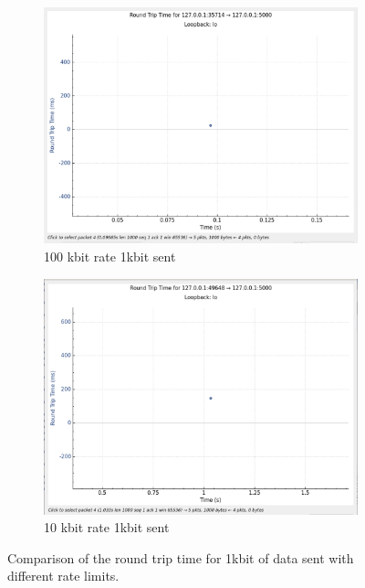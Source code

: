 \documentclass{report}
\begin{document}
\begin{figure}[H]
    \begin{subfigure}[b]{0.45\textwidth}
        \centering
        \includegraphics[width=\textwidth]{Pics/Cubic/r100kbit_s1000_rtt}
        \caption{100 kbit rate 1kbit sent}
    \end{subfigure}
    \hfill
    \begin{subfigure}[b]{0.45\textwidth}
        \centering
        \includegraphics[width=\textwidth]{Pics/Cubic/r10kbit_s1000_rtt}
        \caption{10 kbit rate 1kbit sent}
    \end{subfigure}
    \caption{Comparison of the round trip time for 1kbit of data sent with different rate limits.}
    \label{fig:four_images}
\end{figure}
\end{document}
